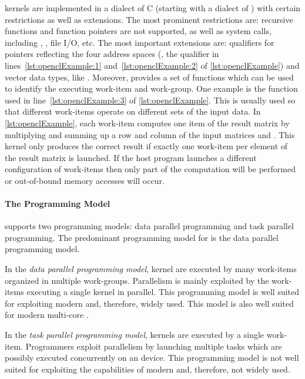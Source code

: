 \OpenCL kernels are implemented in a dialect of C (starting with  a dialect of \Cpp) with certain restrictions as well as extensions.
The most prominent restrictions are:
recursive functions and function pointers are not supported, as well as system calls, including , , file I/O, etc.
The most important extensions are:
qualifiers for pointers reflecting the four address spaces (\eg, the  qualifier in lines~\ref{lst:openclExample:1} and~\ref{lst:openclExample:2} of \autoref{lst:openclExample}) and vector data types, like .
Moreover, \OpenCL provides a set of functions which can be used to identify the executing work-item and work-group.
One example is the  function used in line~\ref{lst:openclExample:3} of \autoref{lst:openclExample}.
This is usually used so that different work-items operate on different sets of the input data.
In \autoref{lst:openclExample}, each work-item computes one item of the result matrix  by multiplying and summing up a row and column of the input matrices  and .
This kernel only produces the correct result if exactly one work-item per element of the result matrix is launched.
If the host program launches a different configuration of work-items then only part of the computation will be performed or out-of-bound memory accesses will occur.

\paragraph{The \OpenCL Programming Model}

\OpenCL supports two programming models: data parallel programming and task parallel programming.
The predominant programming model for \OpenCL is the data parallel programming model.

In the \emph{data parallel programming model}, kernel are executed by many work-items organized in multiple work-groups.
Parallelism is mainly exploited by the work-items executing a single kernel in parallel.
This programming model is well suited for exploiting modern \GPUs and, therefore, widely used.
This model is also well suited for modern multi-core \CPUs.

In the \emph{task parallel programming model}, kernels are executed by a single work-item.
Programmers exploit parallelism by launching multiple tasks which are possibly executed concurrently on an \OpenCL device.
This programming model is not well suited for exploiting the capabilities of modern \GPUs and, therefore, not widely used.

